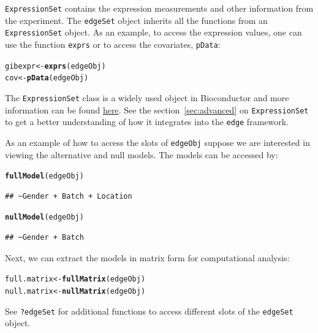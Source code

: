 \documentclass{article}\usepackage[]{graphicx}\usepackage[]{color}
\makeatletter
\newcommand{\hlstd}[1]{\textcolor[rgb]{0.345,0.345,0.345}{#1}}%
\newcommand{\hlkwb}[1]{\textcolor[rgb]{0.69,0.353,0.396}{#1}}%
\newcommand{\hlkwd}[1]{\textcolor[rgb]{0.737,0.353,0.396}{\textbf{#1}}}%
\newenvironment{kframe}{%
 \def\at@end@of@kframe{}%
 \ifinner\ifhmode%
  \def\at@end@of@kframe{\end{minipage}}%
  \begin{minipage}{\columnwidth}%
 \fi\fi%
 \def\FrameCommand##1{\hskip\@totalleftmargin \hskip-\fboxsep
 \colorbox{shadecolor}{##1}\hskip-\fboxsep
     \hskip-\linewidth \hskip-\@totalleftmargin \hskip\columnwidth}%
 \MakeFramed {\advance\hsize-\width
   \@totalleftmargin\z@ \linewidth\hsize
   \@setminipage}}%
 {\par\unskip\endMakeFramed%
 \at@end@of@kframe}
\newenvironment{knitrout}{}{} %
\makeatother
\begin{document}
{\tt ExpressionSet} contains the expression measurements and other information from the experiment. The {\tt edgeSet} object inherits all the functions from an {\tt ExpressionSet} object. As an example, to access the expression values, one can use the function {\tt exprs} or to access the covariates, {\tt pData}:
\begin{knitrout}
\color{fgcolor}\begin{kframe}
\begin{alltt}
\hlstd{gibexpr} \hlkwb{<-} \hlkwd{exprs}\hlstd{(edgeObj)}
\hlstd{cov} \hlkwb{<-} \hlkwd{pData}\hlstd{(edgeObj)}
\end{alltt}
\end{kframe}
\end{knitrout}
The {\tt ExpressionSet} class is a widely used object in Bioconductor and more information can be found \href{http://www.bioconductor.org/packages/2.14/bioc/html/Biobase.html}{here}. See the section~\ref{sec:advanced} on {\tt ExpressionSet} to get a better understanding of how it integrates into the {\tt edge} framework.

As an example of how to access the slots of {\tt edgeObj} suppose we are interested in viewing the alternative and null models. The models can be accessed by:
\begin{knitrout}
\color{fgcolor}\begin{kframe}
\begin{alltt}
\hlkwd{fullModel}\hlstd{(edgeObj)}
\end{alltt}
\begin{verbatim}
## ~Gender + Batch + Location
\end{verbatim}
\begin{alltt}
\hlkwd{nullModel}\hlstd{(edgeObj)}
\end{alltt}
\begin{verbatim}
## ~Gender + Batch
\end{verbatim}
\end{kframe}
\end{knitrout}
Next, we can extract the models in matrix form for computational analysis:
\begin{knitrout}
\color{fgcolor}\begin{kframe}
\begin{alltt}
\hlstd{full.matrix} \hlkwb{<-} \hlkwd{fullMatrix}\hlstd{(edgeObj)}
\hlstd{null.matrix} \hlkwb{<-} \hlkwd{nullMatrix}\hlstd{(edgeObj)}
\end{alltt}
\end{kframe}
\end{knitrout}
See {\tt ?edgeSet} for additional functions to access different slots of the {\tt edgeSet} object. 
\end{document}
